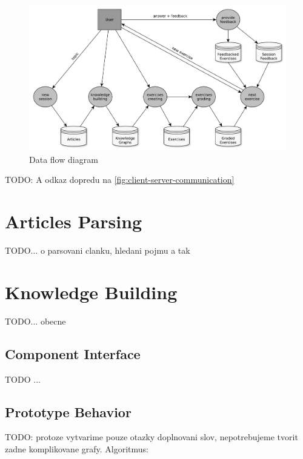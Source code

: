 \documentclass[a4paper, 12pt, twoside]{fithesis2}		%
\renewcommand{\_}{\leavevmode \kern0.0em\vbox{\hrule width0.4em}}
\begin{document}
\begin{figure}[h]
  \centering
  \includegraphics[width=\textwidth]{images/data-flow-diagram.pdf}
  \caption{Data flow diagram}
  \label{fig:data-flow-diagram}
\end{figure}

TODO: A odkaz dopredu na \autoref{fig:client-server-communication}

\section{Articles Parsing}

TODO... o parsovani clanku, hledani pojmu a tak

\section{Knowledge Building}
\label{sec:smartoo-knowledge}

TODO... obecne

\subsection{Component Interface}

TODO ...

\subsection{Prototype Behavior}

TODO: protoze vytvarime pouze otazky doplnovani slov, nepotrebujeme tvorit zadne komplikovane grafy. Algoritmus:
\end{document}
